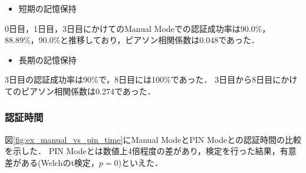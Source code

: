 \begin{itemize}
  \item 短期の記憶保持
\end{itemize}
0日目，1日目，3日目にかけてのManual Modeでの認証成功率は90.0\%，88.89\%，90.0\%と推移しており，ピアソン相関係数は0.048であった．

\begin{itemize}
  \item 長期の記憶保持
\end{itemize}
3日目の認証成功率は90\%で，8日目には100\%であった．
3日目から8日目にかけてのピアソン相関係数は0.274であった．

\subsubsection{認証時間}
図\ref{fig:ex_manual_vs_pin_time}にManual ModeとPIN Modeとの認証時間の比較を示した．
PIN Modeとは数値上4倍程度の差があり，検定を行った結果，有意差がある(Welchのt検定，$ p = 0 $)といえた．


